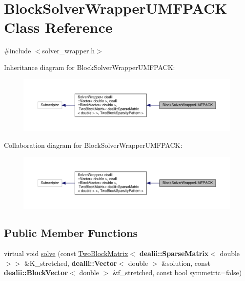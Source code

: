 \hypertarget{class_block_solver_wrapper_u_m_f_p_a_c_k}{}\section{Block\+Solver\+Wrapper\+U\+M\+F\+P\+A\+CK Class Reference}
\label{class_block_solver_wrapper_u_m_f_p_a_c_k}


{\ttfamily \#include $<$solver\+\_\+wrapper.\+h$>$}



Inheritance diagram for Block\+Solver\+Wrapper\+U\+M\+F\+P\+A\+CK\+:\nopagebreak
\begin{figure}[H]
\begin{center}
\leavevmode
\includegraphics[width=350pt]{class_block_solver_wrapper_u_m_f_p_a_c_k__inherit__graph}
\end{center}
\end{figure}


Collaboration diagram for Block\+Solver\+Wrapper\+U\+M\+F\+P\+A\+CK\+:\nopagebreak
\begin{figure}[H]
\begin{center}
\leavevmode
\includegraphics[width=350pt]{class_block_solver_wrapper_u_m_f_p_a_c_k__coll__graph}
\end{center}
\end{figure}
\subsection*{Public Member Functions}
\begin{DoxyCompactItemize}
\item 
virtual void \hyperlink{class_block_solver_wrapper_u_m_f_p_a_c_k_a0d27521861712a3b36cc15845e093df2}{solve} (const \hyperlink{class_two_block_matrix}{Two\+Block\+Matrix}$<$ {\bf dealii\+::\+Sparse\+Matrix}$<$ double $>$$>$ \&K\+\_\+stretched, {\bf dealii\+::\+Vector}$<$ double $>$ \&solution, const {\bf dealii\+::\+Block\+Vector}$<$ double $>$ \&f\+\_\+stretched, const bool symmetric=false)
\end{DoxyCompactItemize}



